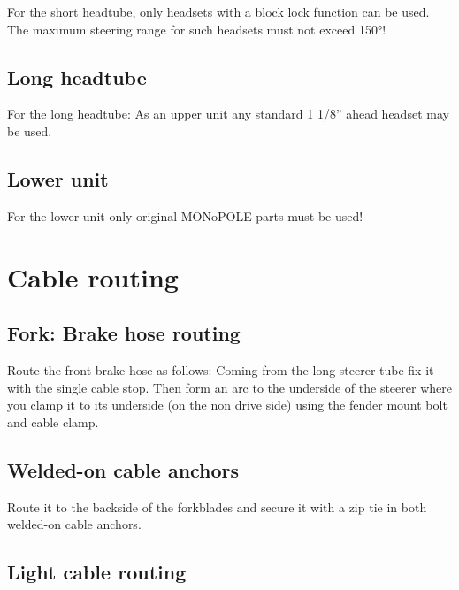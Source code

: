 \documentclass[12 pt]{article}
\newcommand{\bodyimage}[1]{\rightline{}}}
\begin{document}
For the short headtube, only headsets with a block lock function can
be used. The maximum steering range for such headsets must not exceed
150°!

\bodyimage{2_6_1_headsets.svg}

\subsection{Long headtube}

For the long headtube: As an upper unit any standard 1 1/8” ahead
headset may be used.

\bodyimage{2_6_2_headsets.svg}

\subsection{Lower unit}

For the lower unit only original MONoPOLE parts must be used!

\bodyimage{2_6_3_headsets.svg}

\section{Cable routing}

\subsection{Fork: Brake hose routing}

Route the front brake hose as follows: Coming from the long steerer
tube fix it with the single cable stop. Then form an arc to the
underside of the steerer where you clamp it to its underside (on the
non drive side) using the fender mount bolt and cable clamp.

\bodyimage{3_1_1_brake_hose_routing.svg}

\subsection{Welded-on cable anchors}

Route it to the backside of the forkblades and secure it with a zip
tie in both welded-on cable anchors.

\bodyimage{3_1_2_brake_hose_routing.svg}

\subsection{Light cable routing}
\end{document}
